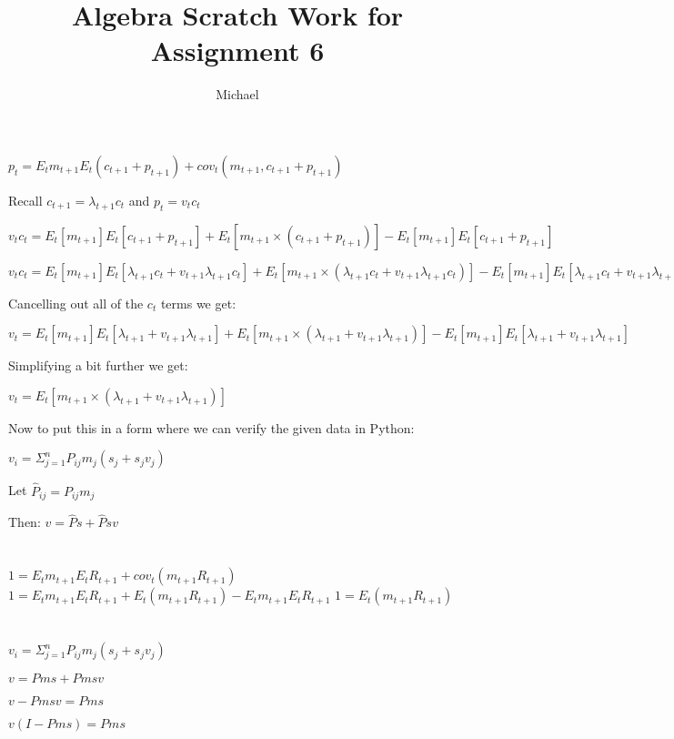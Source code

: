 \documentclass[11pt, oneside]{article}   	%
\title{Algebra Scratch Work for Assignment 6}
\author{Michael}
\begin{document}
\maketitle

\section{}
$ p_t = E_t m_{t+1} E_t (c_{t+1} + p_{t+1}) + cov_t (m_{t+1}, c_{t+1} + p_{t+1})$

Recall $c_{t+1} = \lambda_{t+1} c_t$ and $p_t = v_t c_t$

$v_t c_t = E_t[m_{t+1}] E_t[c_{t+1} + p_{t+1}] + E_t[m_{t+1} \times (c_{t+1} + p_{t+1})] - E_t[m_{t+1}] E_t[c_{t+1} + p_{t+1}]$

$v_t c_t = E_t[m_{t+1}] E_t[\lambda_{t+1} c_{t} + v_{t+1} \lambda_{t+1} c_t] + E_t[m_{t+1} \times (\lambda_{t+1} c_{t} + v_{t+1} \lambda_{t+1} c_t)] - E_t[m_{t+1}] E_t[\lambda_{t+1} c_{t} + v_{t+1} \lambda_{t+1} c_t]$

Cancelling out all of the $c_t$ terms we get:

$v_t = E_t[m_{t+1}] E_t[\lambda_{t+1} + v_{t+1} \lambda_{t+1}] + E_t[m_{t+1} \times (\lambda_{t+1} + v_{t+1} \lambda_{t+1})] - E_t[m_{t+1}] E_t[\lambda_{t+1} + v_{t+1} \lambda_{t+1}]$

Simplifying a bit further we get:

$v_t = E_t[m_{t+1} \times (\lambda_{t+1} + v_{t+1} \lambda_{t+1})]$

Now to put this in a form where we can verify the given data in Python:

$v_i = \Sigma_{j=1}^n P_{ij} m_j (s_j + s_j v_j)$

Let $\hat{P}_{ij} = P_{ij}m_j$ 

Then: $v=\hat{P}s + \hat{P} s v$

\section{}
$1 = E_t m_{t+1} E_t R_{t+1} + cov_t (m_{t+1} R_{t+1})$
$1 = E_t m_{t+1} E_t R_{t+1} + E_t (m_{t+1} R_{t+1}) - E_t m_{t+1} E_t R_{t+1}$
$1 = E_t (m_{t+1} R_{t+1})$

\section{}
$v_i = \Sigma_{j=1}^n P_{ij} m_j (s_j + s_j v_j)$

$v = Pms + Pmsv$

$v - Pmsv = Pms$

$v (I-Pms) = Pms$
\end{document}
